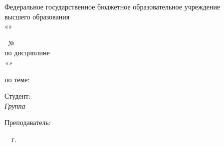 \thispagestyle{empty}

\begin{center}
  \MakeUppercase{\cfgMinistry}

  \vspace{14pt}

  Федеральное государственное бюджетное образовательное учреждение\\
  высшего образования\\
  «\cfgUniversity»

  \vspace{14pt}

  \cfgDepartment
\end{center}

\vfill

\begin{center}
  \MakeUppercase{\cfgReportType}~№\,\cfgLabNumber\\
  по дисциплине\\
  \textit{«\cfgDiscipline»}

  \vspace{20pt}

  по теме:\\
  {\large\MakeUppercase{\cfgTopic}}
\end{center}

\vfill

\noindent Студент:\\
\textit{Группа~\cfgGroup \hfill \cfgStudentShort}

\vspace{14pt}

\noindent Преподаватель:\\
\textit{\cfgTeacherRank \hfill \cfgTeacherShort}

\vfill

\begin{center}
  \cfgCity~\cfgYear~г.
\end{center}
\newpage
